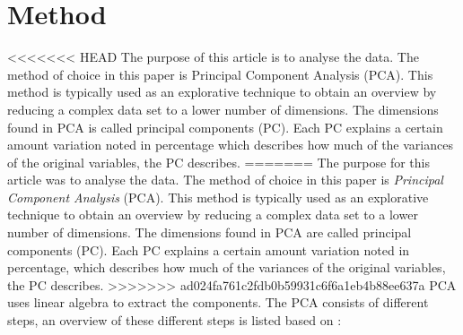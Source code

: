 \section*{Method}
\label{Method}
%
<<<<<<< HEAD
The purpose of this article is to analyse the data. The method of choice in this paper is Principal Component Analysis (PCA). This method is typically used as an explorative technique to obtain an overview by reducing a complex data set to a lower number of dimensions. The dimensions found in PCA is called principal components (PC). Each PC explains a certain amount variation noted in percentage which describes how much of the variances of the original variables, the PC describes.\blankline
=======
The purpose for this article was to analyse the data. The method of choice in this paper is \textit{Principal Component Analysis} (PCA). This method is typically used as an explorative technique to obtain an overview by reducing a complex data set to a lower number of dimensions. The dimensions found in PCA are called principal components (PC). Each PC explains a certain amount variation noted in percentage, which describes how much of the variances of the original variables, the PC describes.\blankline
>>>>>>> ad024fa761c2fdb0b59931c6f6a1eb4b88ee637a
%
PCA uses linear algebra to extract the components. The PCA consists of different steps, an overview of these different steps is listed based on \textcite[pp. 211-213]{Naes2010}:

